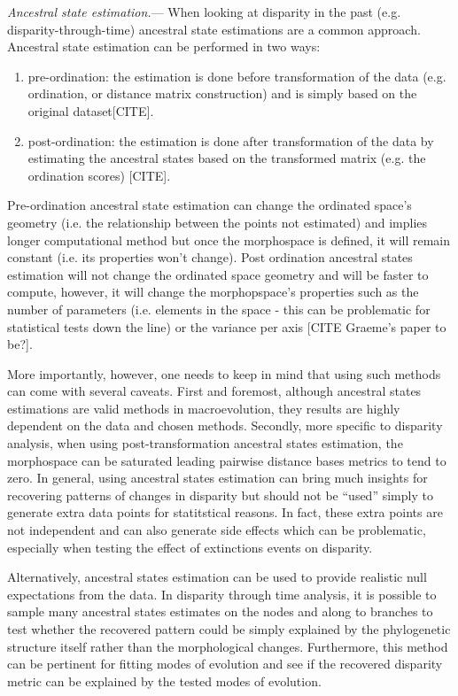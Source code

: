 \documentclass[12pt,letterpaper]{article}
\renewcommand{\subsubsection}[1]{%
\vspace{2ex}
\noindent
\textit{#1.}---}
\begin{document}
\subsubsection{Ancestral state estimation}
When looking at disparity in the past (e.g. disparity-through-time) ancestral state estimations are a common approach.
Ancestral state estimation can be performed in two ways:
\begin{enumerate}
\item pre-ordination: the estimation is done before transformation of the data (e.g. ordination, or distance matrix construction) and is simply based on the original dataset[CITE].
\item post-ordination: the estimation is done after transformation of the data by estimating the ancestral states based on the transformed matrix (e.g. the ordination scores) [CITE].
\end{enumerate}
Pre-ordination ancestral state estimation can change the ordinated space's geometry (i.e. the relationship between the points not estimated) and implies longer computational method but once the morphospace is defined, it will remain constant (i.e. its properties won't change).
Post ordination ancestral states estimation will not change the ordinated space geometry and will be faster to compute, however, it will change the morphopspace's properties such as the number of parameters (i.e. elements in the space - this can be problematic for statistical tests down the line) or the variance per axis [CITE Graeme's paper to be?].

More importantly, however, one needs to keep in mind that using such methods can come with several caveats.
First and foremost, although ancestral states estimations are valid methods in macroevolution, they results are highly dependent on the data and chosen methods.
Secondly, more specific to disparity analysis, when using post-transformation ancestral states estimation, the morphospace can be saturated leading pairwise distance bases metrics to tend to zero.
In general, using ancestral states estimation can bring much insights for recovering patterns of changes in disparity but should not be ``used'' simply to generate extra data points for statitstical reasons.
In fact, these extra points are not independent and can also generate side effects which can be problematic, especially when testing the effect of extinctions events on disparity.

Alternatively, ancestral states estimation can be used to provide realistic null expectations from the data.
In disparity through time analysis, it is possible to sample many ancestral states estimates on the nodes and along to branches to test whether the recovered pattern could be simply explained by the phylogenetic structure itself rather than the morphological changes.
Furthermore, this method can be pertinent for fitting modes of evolution and see if the recovered disparity metric can be explained by the tested modes of evolution.
\end{document}
